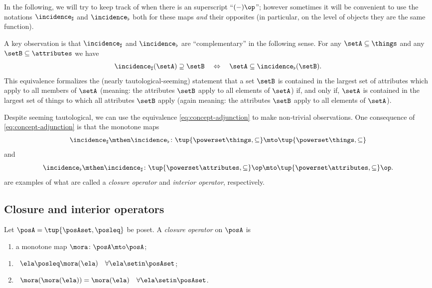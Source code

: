 In the following, we will try to keep track of when there is an superscript ``$( - )\op $''; however sometimes it will be convenient to use the notations $\incidence_\sharp$ and $\incidence_\flat$ both for these maps \emph{and} their opposites (in particular, on the level of objects they are the same function). 

A key observation is that $\incidence_\sharp$ and $\incidence_\flat$ are ``complementary'' in the following sense. For any $\setA \subseteq \things$ and any $\setB \subseteq \attributes$ we have 
\begin{equation}\label{eq:concept-adjunction}
\incidence_\sharp(\setA) \supseteq \setB \quad \Leftrightarrow \quad \setA \subseteq \incidence_\flat(\setB).
\end{equation}
This equivalence formalizes the (nearly tautological-seeming) statement that a set $\setB$ is contained in the largest set of attributes which apply to all members of $\setA$ (meaning: the attributes $\setB$ apply to all elements of $\setA$) if, and only if, $\setA$ is contained in the largest set of things to which all attributes $\setB$ apply (again meaning: the attributes $\setB$ apply to all elements of $\setA$). 

Despite seeming tautological, we can use the equivalence \cref{eq:concept-adjunction} to make non-trivial observations. One consequence of \cref{eq:concept-adjunction} is that the monotone maps 
\begin{equation}\label{eq:fca-closure-operator-things}
\incidence_\sharp \mthen \incidence_\flat \colon \tup{\powerset \things, \subseteq} \mto \tup{\powerset \things, \subseteq}
\end{equation}
and 
\begin{equation}\label{eq:fca-closure-operator-attributes}
\incidence_\flat \mthen \incidence_\sharp \colon \tup{\powerset \attributes, \subseteq}\op \mto \tup{\powerset \attributes, \subseteq}\op.
\end{equation}
are examples of what are called a \emph{closure operator} and \emph{interior operator}, respectively.


\subsection{Closure and interior operators}

\begin{definition}\label{def:closure-operator}
Let $\posA = \tup{\posAset, \posleq}$ be poset. A \emph{closure operator} on $\posA$ is

\constit
\begin{enumerate}
\item a monotone map $\mora \colon \posA \mto \posA$; 
\end{enumerate}

\condit
\begin{enumerate}
\item {} \  $\ela \posleq \mora(\ela) \quad \forall \ela \setin \posAset$;
\item {} \ $\mora (\mora(\ela)) =  \mora(\ela) \quad \forall \ela \setin \posAset$. 
\end{enumerate}
\end{definition}

